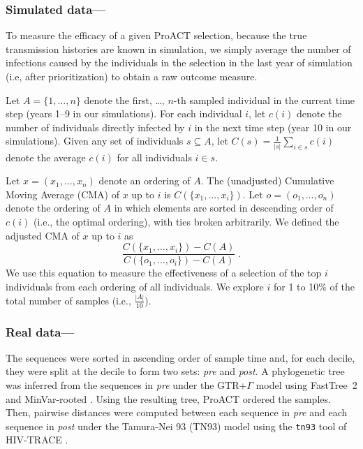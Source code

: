 \documentclass[oupdraft]{sysbio}
\begin{document}
\subsubsection{Simulated data---}
To measure the efficacy of a given ProACT selection,
because the true transmission histories are known in simulation,
we simply average the number of infections caused by the individuals in the selection in the last year of simulation (i.e, after prioritization)
to obtain a raw outcome measure.

Let $A=\{1,\ldots,n\}$ denote the first, \ldots, $n$-th sampled individual in the current time step (years 1--9 in our simulations). For each individual $i$, let $c(i)$ denote the number of individuals directly infected by $i$ in the next time step (year 10 in our simulations). 
Given any set of individuals $s\subseteq A$, let $C(s)=\frac{1}{|s|}\sum_{i\in s}{c(i)}$ denote the average $c(i)$ for all individuals $i\in s$.

Let $x=(x_1,\ldots,x_n)$ denote an ordering of $A$. The (unadjusted) Cumulative Moving Average (CMA) of $x$ up to $i$ is $C\left(\{x_1,\ldots,x_i\}\right)$.
Let $o=(o_1,\ldots,o_n)$ denote the ordering of $A$ in which elements are sorted in descending order of $c(i)$ (i.e., the optimal ordering), with ties broken arbitrarily. 
We defined the adjusted CMA of $x$ up to $i$ as
\begin{equation*}%
    \frac{C\left(\{x_1,\ldots,x_i\}\right)-C(A)}{C\left(\{o_1,\ldots,o_i\}\right)-C(A)}\; .
\end{equation*}
We use this equation to measure the effectiveness of a selection of the top $i$ individuals from each ordering of all individuals.
We explore $i$ for 1 to 10\% of the total number of samples (i.e., $\frac{|A|}{10}$). 

\subsubsection{Real data---}
The sequences were sorted in ascending order of sample time and,
for each decile,
they were split at the decile to form two sets: \textit{pre} and \textit{post}. A phylogenetic tree was inferred from the sequences in \textit{pre} under the GTR+$\Gamma$ model using FastTree~2 \citep{Price2010} and MinVar-rooted \citep{Mai2017}.
Using the resulting tree, ProACT ordered the samples. 
Then, pairwise distances were computed between each sequence in \textit{pre} and each sequence in \textit{post} under the Tamura-Nei 93 (TN93) model \citep{Tamura1993} using the \texttt{tn93} tool of HIV-TRACE \citep{Pond2018}.
\end{document}
